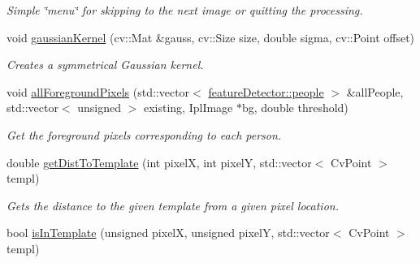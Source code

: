 \begin{DoxyCompactItemize}
\begin{DoxyCompactList}\small\item\em Simple \char`\"{}menu\char`\"{} for skipping to the next image or quitting the processing. \item\end{DoxyCompactList}\item 
\hypertarget{classfeatureDetector_aa64fcc924225b814c411117db3739d9d}{
void \hyperlink{classfeatureDetector_aa64fcc924225b814c411117db3739d9d}{gaussianKernel} (cv::Mat \&gauss, cv::Size size, double sigma, cv::Point offset)}
\label{classfeatureDetector_aa64fcc924225b814c411117db3739d9d}

\begin{DoxyCompactList}\small\item\em Creates a symmetrical Gaussian kernel. \item\end{DoxyCompactList}\item 
\hypertarget{classfeatureDetector_ab4b667d370e7f97c1aa8be174b8a5896}{
void \hyperlink{classfeatureDetector_ab4b667d370e7f97c1aa8be174b8a5896}{allForegroundPixels} (std::vector$<$ \hyperlink{structfeatureDetector_1_1people}{featureDetector::people} $>$ \&allPeople, std::vector$<$ unsigned $>$ existing, IplImage $\ast$bg, double threshold)}
\label{classfeatureDetector_ab4b667d370e7f97c1aa8be174b8a5896}

\begin{DoxyCompactList}\small\item\em Get the foreground pixels corresponding to each person. \item\end{DoxyCompactList}\item 
\hypertarget{classfeatureDetector_ad847d108c04cb1bbab5edbbe6a0a1dd9}{
double \hyperlink{classfeatureDetector_ad847d108c04cb1bbab5edbbe6a0a1dd9}{getDistToTemplate} (int pixelX, int pixelY, std::vector$<$ CvPoint $>$ templ)}
\label{classfeatureDetector_ad847d108c04cb1bbab5edbbe6a0a1dd9}

\begin{DoxyCompactList}\small\item\em Gets the distance to the given template from a given pixel location. \item\end{DoxyCompactList}\item 
\hypertarget{classfeatureDetector_ad6e52ebcec6482cc8fe7c214d4ef665a}{
bool \hyperlink{classfeatureDetector_ad6e52ebcec6482cc8fe7c214d4ef665a}{isInTemplate} (unsigned pixelX, unsigned pixelY, std::vector$<$ CvPoint $>$ templ)}
\label{classfeatureDetector_ad6e52ebcec6482cc8fe7c214d4ef665a}


\end{DoxyCompactItemize}

